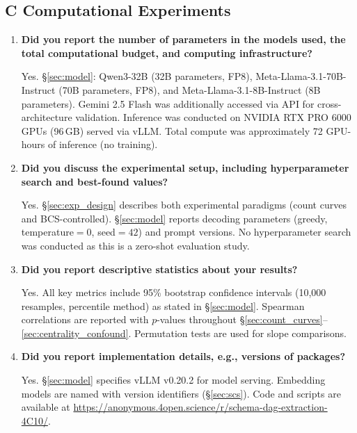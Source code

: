 \subsection*{C \quad Computational Experiments}

\begin{enumerate}[label=\textbf{C\arabic*.},leftmargin=*,itemsep=4pt]

\item \textbf{Did you report the number of parameters in the models used, the total computational budget, and computing infrastructure?}

Yes. \S\ref{sec:model}: Qwen3-32B (32B parameters, FP8), Meta-Llama-3.1-70B-Instruct (70B parameters, FP8), and Meta-Llama-3.1-8B-Instruct (8B parameters). Gemini 2.5 Flash was additionally accessed via API for cross-architecture validation. Inference was conducted on NVIDIA RTX PRO 6000 GPUs (96\,GB) served via vLLM. Total compute was approximately 72 GPU-hours of inference (no training).

\item \textbf{Did you discuss the experimental setup, including hyperparameter search and best-found values?}

Yes. \S\ref{sec:exp_design} describes both experimental paradigms (count curves and BCS-controlled). \S\ref{sec:model} reports decoding parameters (greedy, temperature${}=0$, seed${}=42$) and prompt versions. No hyperparameter search was conducted as this is a zero-shot evaluation study.

\item \textbf{Did you report descriptive statistics about your results?}

Yes. All key metrics include 95\% bootstrap confidence intervals (10{,}000 resamples, percentile method) as stated in \S\ref{sec:model}. Spearman correlations are reported with $p$-values throughout \S\ref{sec:count_curves}--\ref{sec:centrality_confound}. Permutation tests are used for slope comparisons.

\item \textbf{Did you report implementation details, e.g., versions of packages?}

Yes. \S\ref{sec:model} specifies vLLM v0.20.2 for model serving. Embedding models are named with version identifiers (\S\ref{sec:scs}). Code and scripts are available at \url{https://anonymous.4open.science/r/schema-dag-extraction-4C10/}.

\end{enumerate}

